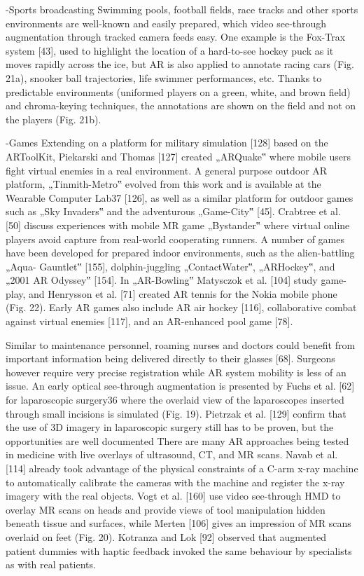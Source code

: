 -Sports broadcasting
Swimming pools, football fields, race tracks and other
sports environments are well-known and easily prepared,
which video see-through augmentation through tracked
camera feeds easy. One example is the Fox-Trax system [43],
used to highlight the location of a hard-to-see hockey puck as
it moves rapidly across the ice, but AR is also applied to
annotate racing cars (Fig. 21a), snooker ball trajectories, life
swimmer performances, etc. Thanks to predictable environments
(uniformed players on a green, white, and brown field) and chroma-keying techniques, the annotations are
shown on the field and not on the players (Fig. 21b).

-Games
Extending on a platform for military simulation [128]
based on the ARToolKit, Piekarski and Thomas [127] created
„ARQuake‟ where mobile users fight virtual enemies in a
real environment. A general purpose outdoor AR platform,
„Tinmith-Metro‟ evolved from this work and is available at
the Wearable Computer Lab37 [126], as well as a similar
platform for outdoor games such as „Sky Invaders‟ and the
adventurous „Game-City‟ [45]. Crabtree et al. [50] discuss
experiences with mobile MR game „Bystander‟ where virtual
online players avoid capture from real-world cooperating
runners.
A number of games have been developed for prepared
indoor environments, such as the alien-battling „Aqua-
Gauntlet‟ [155], dolphin-juggling „ContactWater‟, „ARHockey‟,
and „2001 AR Odyssey‟ [154]. In „AR-Bowling‟
Matysczok et al. [104] study game-play, and Henrysson et al.
[71] created AR tennis for the Nokia mobile phone (Fig. 22).
Early AR games also include AR air hockey [116], collaborative
combat against virtual enemies [117], and an
AR-enhanced pool game [78].







Similar to maintenance personnel, roaming nurses and
doctors could benefit from important information being
delivered directly to their glasses [68]. Surgeons however
require very precise registration while AR system mobility is
less of an issue. An early optical see-through augmentation is
presented by Fuchs et al. [62] for laparoscopic surgery36
where the overlaid view of the laparoscopes inserted through
small incisions is simulated (Fig. 19). Pietrzak et al. [129] confirm that the use of 3D imagery in laparoscopic surgery
still has to be proven, but the opportunities are well documented There are many AR approaches being tested in medicine
with live overlays of ultrasound, CT, and MR scans. Navab et
al. [114] already took advantage of the physical constraints of
a C-arm x-ray machine to automatically calibrate the cameras
with the machine and register the x-ray imagery with the real
objects. Vogt et al. [160] use video see-through HMD to
overlay MR scans on heads and provide views of tool manipulation
hidden beneath tissue and surfaces, while Merten
[106] gives an impression of MR scans overlaid on feet (Fig.
20). Kotranza and Lok [92] observed that augmented patient
dummies with haptic feedback invoked the same behaviour
by specialists as with real patients.

